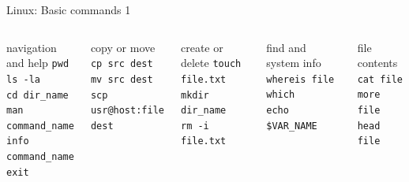 \documentclass{beamer}
\begin{document}
\begin{frame}{Linux: Basic commands 1}
  \begin{columns}
    \begin{block}{navigation and help}
      \texttt{pwd} \\
      \texttt{ls -la} \\
      \texttt{cd dir\_name} \\
      \texttt{man command\_name} \\
      \texttt{info command\_name} \\
      \texttt{exit}
    \end{block}
    \begin{block}{copy or move}
      \texttt{cp src dest} \\
      \texttt{mv src dest} \\
      \texttt{scp usr@host:file dest}
    \end{block}

    \begin{block}{create or delete}
      \texttt{touch file.txt} \\ 
      \texttt{mkdir dir\_name} \\ 
      \texttt{rm -i file.txt}
    \end{block}
    \begin{block}{find and system info}
      \texttt{whereis file} \\
      \texttt{which} \\
      \texttt{echo \$VAR\_NAME}
    \end{block}
    \begin{block}{file contents}
      \texttt{cat file} \\
      \texttt{more file} \\
      \texttt{head file}
    \end{block}    
  \end{columns}
\end{frame}
\end{document}
